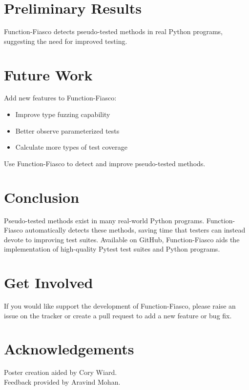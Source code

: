 \documentclass[a0paper,fleqn]{betterposter}
\begin{document}
{  \section{Preliminary Results}

  \vspace*{-1in}

  

  \vspace*{-.5in}

  Function-Fiasco detects pseudo-tested methods in real Python programs,
  suggesting the need for improved testing.

  \section{Future Work}
  Add new features to Function-Fiasco: \\
  \vspace*{-.5in}

  \begin{itemize}[leftmargin=*]

    \item{Improve type fuzzing capability}
    \item{Better observe parameterized tests}
    \item{Calculate more types of test coverage}

  \end{itemize}

  \vspace{.5em}
  Use Function-Fiasco to detect and improve pseudo-tested methods.

  \section{Conclusion}
  Pseudo-tested methods exist in many real-world Python programs.
  Function-Fiasco automatically detects these methods, saving time that testers
  can instead devote to improving test suites.
  Available on GitHub, Function-Fiasco aids the implementation of high-quality
  Pytest test suites and Python programs.

  \section{Get Involved}
  If you would like support the development of Function-Fiasco, please raise an
  issue on the tracker or create a pull request to add a new feature or bug
  fix.
  \vfill

  \section{Acknowledgements}
  Poster creation aided by Cory Wiard.\\
  Feedback provided by Aravind Mohan.\\


}
\end{document}
